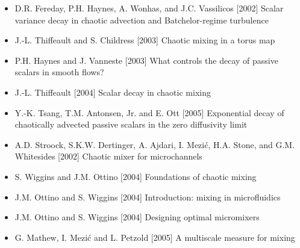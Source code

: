 \documentclass[12pt,t]{beamer}
\begin{document}
\begin{frame}
  \begin{itemize}
  \item D.R. Fereday, P.H. Haynes, A. Wonhas, and J.C. Vassilicos
    [2002] Scalar variance decay in chaotic advection and
    Batchelor-regime turbulence
  \item J.-L. Thiffeault and S. Childress [2003] Chaotic mixing in a
    torus map
  \item P.H. Haynes and J. Vanneste [2003] What controls the decay of
    passive scalars in smooth flows?
  \item J.-L. Thiffeault [2004] Scalar decay in chaotic mixing
  \item Y.-K. Tsang, T.M. Antonsen, Jr. and E. Ott [2005] Exponential
    decay of chaotically advected passive scalars in the zero
    diffusivity limit
  \end{itemize}
\end{frame}
\begin{frame}
  \begin{itemize}
  \item A.D. Stroock, S.K.W. Dertinger, A. Ajdari, I. Mezi{\'c},
    H.A. Stone, and G.M. Whitesides [2002] Chaotic mixer for
    microchannels
  \item S. Wiggins and J.M. Ottino [2004] Foundations of chaotic mixing
  \item J.M. Ottino and S. Wiggins [2004] Introduction: mixing in
    microfluidics
  \item J.M. Ottino and S. Wiggins [2004] Designing optimal
    micromixers
  \item G. Mathew, I. Mezi{\'c} and L. Petzold [2005] A multiscale
    measure for mixing
  \end{itemize}
\end{frame}
\end{document}
